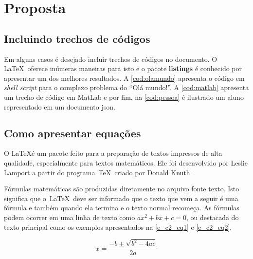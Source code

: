 \chapter{Proposta}\label{cap:proposta}


\section{Incluindo trechos de códigos}\label{sec:codigos}

Em alguns casos é desejado incluir trechos de códigos no documento. O \LaTeX~oferece inúmeras maneiras para isto e o pacote \textbf{listings} é conhecido por apresentar um dos melhores resultados. A \autoref{cod:olamundo} apresenta o código em \textit{shell script} para o complexo problema do ``Olá mundo!''. A \autoref{cod:matlab} apresenta um trecho de código em MatLab e por fim, na \autoref{cod:pessoa} é ilustrado um aluno representado em um documento \gls{json}.








\section{Como apresentar equações}\label{sec:equacoes}

O \LaTeX é um pacote feito para a preparação de textos impressos de alta qualidade, especialmente
para textos matemáticos. Ele foi desenvolvido por Leslie Lamport a partir do programa~\TeX~criado por Donald Knuth.

Fórmulas matemáticas são produzidas diretamente no arquivo fonte texto. Isto significa que o~\LaTeX~deve ser informado que o texto que vem a seguir é uma fórmula e também quando ela termina e o texto normal recomeça. As fórmulas podem ocorrer em uma linha de texto como $ ax^2 + bx + c = 0 $, ou destacada do texto principal como os exemplos apresentados na \autoref{e_c2_eq1} e \autoref{e_c2_eq2}.

\begin{equation}
    x=\frac{-b\pm\sqrt{b^2-4ac}}{2a}
    \label{e_c2_eq1}
\end{equation}

